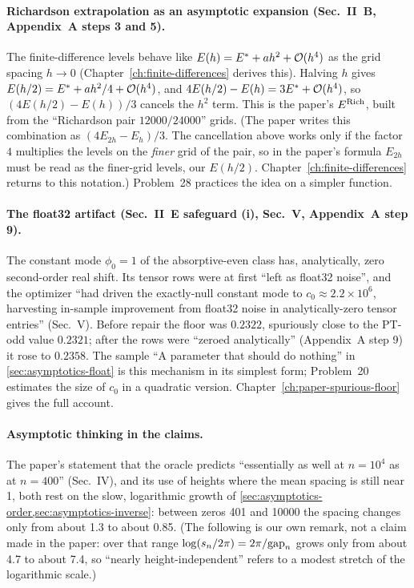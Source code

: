 \paragraph{Richardson extrapolation as an asymptotic expansion (Sec.~II~B, Appendix~A steps 3 and 5).} The finite-difference levels behave like $E(h)=E^\ast+ah^2+\mathcal{O}(h^4)$ as the grid spacing $h\to0$ (Chapter~\ref{ch:finite-differences} derives this). Halving $h$ gives $E(h/2)=E^\ast+ah^2/4+\mathcal{O}(h^4)$, and $4E(h/2)-E(h)=3E^\ast+\mathcal{O}(h^4)$, so $(4E(h/2)-E(h))/3$ cancels the $h^2$ term. This is the paper's $E^{\rm Rich}$, built from the ``Richardson pair $12000/24000$'' grids. (The paper writes this combination as $(4E_{2h}-E_h)/3$. The cancellation above works only if the factor $4$ multiplies the levels on the \emph{finer} grid of the pair, so in the paper's formula $E_{2h}$ must be read as the finer-grid levels, our $E(h/2)$. Chapter~\ref{ch:finite-differences} returns to this notation.) Problem~28 practices the idea on a simpler function.

\paragraph{The float32 artifact (Sec.~II~E safeguard (i), Sec.~V, Appendix~A step 9).} The constant mode $\phi_0=1$ of the absorptive-even class has, analytically, zero second-order real shift. Its tensor rows were at first ``left as float32 noise'', and the optimizer ``had driven the exactly-null constant mode to $c_0\approx2.2\times10^{6}$, harvesting in-sample improvement from float32 noise in analytically-zero tensor entries'' (Sec.~V). Before repair the floor was $0.2322$, spuriously close to the PT-odd value $0.2321$; after the rows were ``zeroed analytically'' (Appendix~A step 9) it rose to $0.2358$. The sample ``A parameter that should do nothing'' in \cref{sec:asymptotics-float} is this mechanism in its simplest form; Problem~20 estimates the size of $c_0$ in a quadratic version. Chapter~\ref{ch:paper-spurious-floor} gives the full account.

\paragraph{Asymptotic thinking in the claims.} The paper's statement that the oracle predicts ``essentially as well at $n=10^4$ as at $n=400$'' (Sec.~IV), and its use of heights where the mean spacing is still near 1, both rest on the slow, logarithmic growth of \cref{sec:asymptotics-order,sec:asymptotics-inverse}: between zeros 401 and 10000 the spacing changes only from about 1.3 to about 0.85. (The following is our own remark, not a claim made in the paper: over that range $\log(s_n/2\pi)=2\pi/\mathrm{gap}_n$ grows only from about 4.7 to about 7.4, so ``nearly height-independent'' refers to a modest stretch of the logarithmic scale.)

